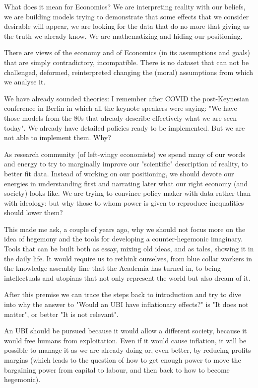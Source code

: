 What does it mean for Economics?
We are interpreting reality with our beliefs, we are building models trying to demonstrate that some effects that we consider desirable will appear, we are looking for the data that do no more that giving us the truth we already know.
We are mathematizing and hiding our positioning.

There are views of the economy and of Economics (in its assumptions and goals) that are simply contradictory, incompatible.
There is no dataset that can not be challenged, deformed, reinterpreted changing the (moral) assumptions from which we analyse it.

We have already sounded theories: I remember after COVID the post-Keynesian conference in Berlin in which all the keynote speakers were saying: "We have those models from the 80s that already describe effectively what we are seen today".
We already have detailed policies ready to be implemented. But we are not able to implement them. Why?

As research community (of left-wingy economists) we spend many of our words and energy to try to marginally improve our "scientific" description of reality, to better fit data.
Instead of working on our positioning, we should devote our energies in understanding first and narrating later what our right economy (and society) looks like.
We are trying to convince policy-maker with data rather than with ideology: but why those to whom power is given to reproduce inequalities should lower them?

This made me ask, a couple of years ago, why we should not focus more on the idea of hegemony and the tools for developing a counter-hegemonic imaginary.
Tools that can be built both as essay, mixing old ideas, and as tales, showing it in the daily life.
It would require us to rethink ourselves, from blue collar workers in the knowledge assembly line that the Academia has turned in, to being intellectuals and utopians that not only represent the world but also dream of it.

After this premise we can trace the steps back to introduction and try to dive into why the answer to "Would an UBI have inflationary effects?" is "It does not matter", or better "It is not relevant".

An UBI should be pursued because it would allow a different society, because it would free humans from exploitation. Even if it would cause inflation, it will be possible to manage it as we are already doing or, even better, by reducing profits margins (which leads to the question of how to get enough power to move the bargaining power from capital to labour, and then back to how to become hegemonic).


